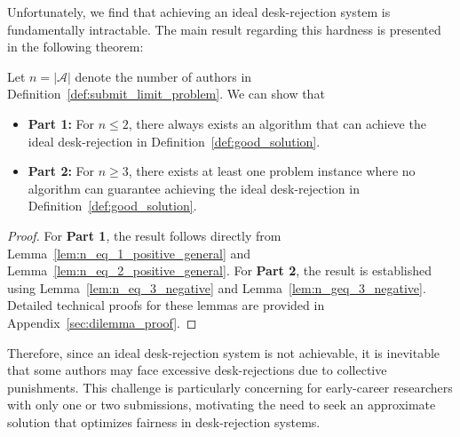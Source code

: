Unfortunately, we find that achieving an ideal desk-rejection system is fundamentally intractable. The main result regarding this hardness is presented in the following theorem:

\begin{theorem}\label{thm:main_res_general}
Let $n = |\mathcal{A}|$ denote the number of authors in Definition~\ref{def:submit_limit_problem}. We can show that

\begin{itemize}
    \item {\bf Part 1:} For $n \le 2$, there always exists an algorithm that can achieve the ideal desk-rejection in Definition~\ref{def:good_solution}.
    \item {\bf Part 2:} For $n \geq 3$, there exists at least one problem instance where no algorithm can guarantee achieving the ideal desk-rejection in Definition~\ref{def:good_solution}.
\end{itemize}
\end{theorem}

\begin{proof} For {\bf Part 1}, the result follows directly from Lemma~\ref{lem:n_eq_1_positive_general} and Lemma~\ref{lem:n_eq_2_positive_general}. For {\bf Part 2}, the result is established using Lemma~\ref{lem:n_eq_3_negative} and Lemma~\ref{lem:n_geq_3_negative}. 
Detailed technical proofs for these lemmas are provided in Appendix~\ref{sec:dilemma_proof}.
\end{proof}

Therefore, since an ideal desk-rejection system is not achievable, it is inevitable that some authors may face excessive desk-rejections due to collective punishments. This challenge is particularly concerning for early-career researchers with only one or two submissions, motivating the need to seek an approximate solution that optimizes fairness in desk-rejection systems.

